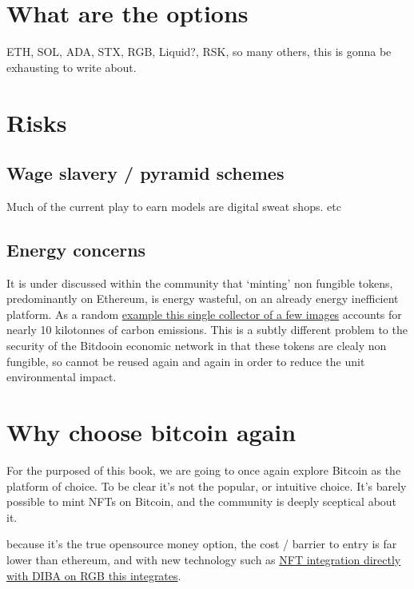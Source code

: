 \section{What are the options }
ETH, SOL, ADA, STX, RGB, Liquid?, RSK, so many others, this is gonna be exhausting to write about.

\section{Risks}
\subsection{Wage slavery / pyramid schemes}
Much of the current play to earn models are digital sweat shops. etc
\subsection{Energy concerns}
It is under discussed within the community that `minting' non fungible tokens, predominantly on Ethereum, is energy wasteful, on an already energy inefficient platform. As a random \href{https://carbon.fyi/?address=0x6Ec30Fd91A504Aad948839B985C7263888B2Ad68} {example this single collector of a few images} accounts for nearly 10 kilotonnes of carbon emissions. This is a subtly different problem to the security of the Bitdooin economic network in that these tokens are clealy non fungible, so cannot be reused again and again in order to reduce the unit environmental impact. 
\section{Why choose bitcoin again }
For the purposed of this book, we are going to once again explore Bitcoin as the platform of choice. To be clear it's not the popular, or intuitive choice. It's barely possible to mint NFTs on Bitcoin, and the community is deeply sceptical about it.\par
because it's the true opensource money option, the cost / barrier to entry is far lower than ethereum, and with new technology such as \href{https://diba.io}{NFT integration directly with DIBA on RGB this integrates}. 
